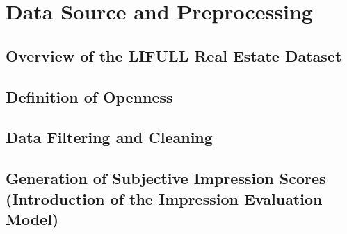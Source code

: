 \chapter{Data Source and Preprocessing}

\section{Overview of the LIFULL Real Estate Dataset}

% 

\section{Definition of Openness}

% 

\section{Data Filtering and Cleaning}

% 

\section{Generation of Subjective Impression Scores (Introduction of the Impression Evaluation Model)}
